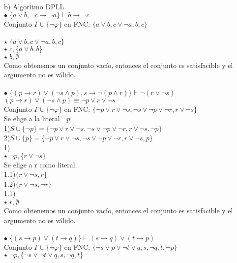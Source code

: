 \documentclass{article}
\begin{document}
b) Algoritmo DPLL \\
$\bullet \; \{a \lor b, \neg c \rightarrow \neg a \} \vdash b \rightarrow \neg c$\\
Conjunto $\Gamma \cup \{\neg \varphi \}$ en FNC: $\{a \lor b, c \lor \neg a, b, c\}$\\ \ \\
$\star \; \{a \lor b, c \lor \neg a, b, c\}$\\
$\star \; c,\{a \lor b, b\}$ \\
$\star \; b,\emptyset $ \\
Como obtenemos un conjunto vacío, entonces el conjunto es satisfacible y el argumento no es válido.\\ \ \\
$\bullet \; \{(p \rightarrow r) \lor (\neg s \land p),s \rightarrow \neg (p \land r)\} \vdash \neg (r \lor \neg s)$ \\
$(p \rightarrow r) \lor (\neg s \land p) \equiv \neg p \lor r \lor \neg s$ \\
Conjunto $\Gamma \cup \{\neg \varphi \}$ en FNC: $\{\neg p \lor r \lor \neg s, \neg s \lor \neg p \lor \neg r, r \lor \neg s\}$\\
Se elige a la literal $\neg p$\\
1)$S \cup \{\neg p\} = \{\neg p \lor r \lor \neg s, \neg s \lor \neg p \lor \neg r, r \lor \neg s, \neg p\}$\\
2)$S \cup \{p\} = \{\neg p \lor r \lor \neg s, \neg s \lor \neg p \lor \neg r, r \lor \neg s, p\}$\\
1)\\
$\star \; \neg p, \{ r \lor \neg s \}$ \\
Se elige a r como literal.\\
1.1)$\{r \lor \neg s,r\}$ \\
1.2)$\{r \lor \neg s,\neg r\}$\\
1.1)\\
$\star \; r, \emptyset$\\
Como obtenemos un conjunto vacío, entonces el conjunto es satisfacible y el argumento no es válido.\\ \ \\
$\bullet \; \{(s \rightarrow p) \lor (t \rightarrow q)\} \vdash (s \rightarrow q) \lor (t \rightarrow p)$\\
Conjunto $\Gamma \cup \{\neg \varphi \}$ en FNC: $\{\neg s \lor p \lor \neg t \lor q, s, \neg q, t, \neg  p\}$\\
$\star \; \neg p, \{\neg s \lor \neg t \lor q, s, \neg q, t\}$\\
\end{document}

